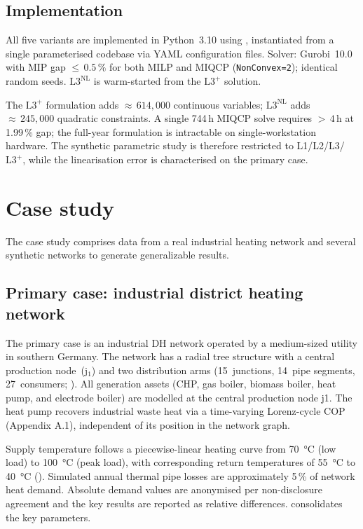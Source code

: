 \documentclass[a4paper,fleqn]{cas-dc}
\newcommand{\Lplus}{\mathrm{L3}^{+}}
\newcommand{\Lnl}{\mathrm{L3}^{\mathrm{NL}}}
\begin{document}
\subsection{Implementation}
\label{sec:model_impl}

All five variants are implemented in Python~3.10 using
\citet{pyomo}, instantiated from a single parameterised codebase
via YAML configuration files. Solver: Gurobi~10.0 with MIP gap
${\leq}\,0.5\,\%$ for both MILP and MIQCP
(\texttt{NonConvex=2}); identical random seeds. $\Lnl$ is
warm-started from the $\Lplus$ solution.

The $\Lplus$ formulation adds ${\approx}\,614{,}000$ continuous
variables; $\Lnl$ adds ${\approx}\,245{,}000$ quadratic
constraints. A single 744\,h MIQCP solve requires ${>}\,4$\,h at
1.99\,\% gap; the full-year formulation is intractable on
single-workstation hardware. The synthetic parametric study is therefore
restricted to L1/L2/L3/$\Lplus$, while the linearisation error is
characterised on the primary case.

\section{Case study}
\label{sec:case_studies}
The case study comprises data from a real industrial heating network and several synthetic networks to generate generalizable results.

\subsection{Primary case: industrial district heating network}
\label{sec:case_stadtbach}

The primary case is an industrial DH network operated by a
medium-sized utility in southern Germany. The network has a radial
tree structure with a central production node~(j$_1$) and two
distribution arms (15~junctions, 14~pipe segments, 27~consumers;
). All generation assets (CHP, gas boiler, biomass boiler, heat pump, and electrode boiler) are modelled at the central production node j1. The heat pump recovers industrial waste heat via a time-varying Lorenz-cycle COP (Appendix A.1), independent of its position in the network graph.

Supply temperature follows a piecewise-linear heating curve from
\SI{70}{\celsius} (low load) to \SI{100}{\celsius} (peak load),
with corresponding return temperatures of \SI{55}{\celsius} to
\SI{40}{\celsius} (). Simulated annual
thermal pipe losses are approximately 5\,\% of network heat
demand. Absolute demand values are anonymised per non-disclosure
agreement and the key results are reported as relative differences.
 consolidates the key parameters.
\end{document}
